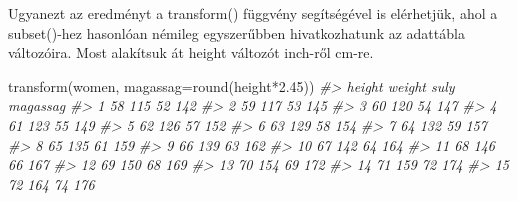 \documentclass[
]{book}
\newenvironment{Shaded}{\begin{snugshade}}{\end{snugshade}}
\newcommand{\AttributeTok}[1]{\textcolor[rgb]{0.77,0.63,0.00}{#1}}
\newcommand{\CommentTok}[1]{\textcolor[rgb]{0.56,0.35,0.01}{\textit{#1}}}
\newcommand{\FloatTok}[1]{\textcolor[rgb]{0.00,0.00,0.81}{#1}}
\newcommand{\FunctionTok}[1]{\textcolor[rgb]{0.00,0.00,0.00}{#1}}
\newcommand{\NormalTok}[1]{#1}
\newcommand{\OtherTok}[1]{\textcolor[rgb]{0.56,0.35,0.01}{#1}}
\newcommand{\SpecialCharTok}[1]{\textcolor[rgb]{0.00,0.00,0.00}{#1}}
\begin{document}
\begin{Shaded}
\end{Shaded}

Ugyanezt az eredményt a transform() függvény segítségével is elérhetjük, ahol a subset()-hez hasonlóan némileg egyszerűbben hivatkozhatunk az adattábla változóira. Most alakítsuk át height változót inch-ről cm-re.

\begin{Shaded}
\begin{Highlighting}[]
\FunctionTok{transform}\NormalTok{(women, }\AttributeTok{magassag=}\FunctionTok{round}\NormalTok{(height}\SpecialCharTok{*}\FloatTok{2.45}\NormalTok{))}
\CommentTok{\#\textgreater{}    height weight suly magassag}
\CommentTok{\#\textgreater{} 1      58    115   52      142}
\CommentTok{\#\textgreater{} 2      59    117   53      145}
\CommentTok{\#\textgreater{} 3      60    120   54      147}
\CommentTok{\#\textgreater{} 4      61    123   55      149}
\CommentTok{\#\textgreater{} 5      62    126   57      152}
\CommentTok{\#\textgreater{} 6      63    129   58      154}
\CommentTok{\#\textgreater{} 7      64    132   59      157}
\CommentTok{\#\textgreater{} 8      65    135   61      159}
\CommentTok{\#\textgreater{} 9      66    139   63      162}
\CommentTok{\#\textgreater{} 10     67    142   64      164}
\CommentTok{\#\textgreater{} 11     68    146   66      167}
\CommentTok{\#\textgreater{} 12     69    150   68      169}
\CommentTok{\#\textgreater{} 13     70    154   69      172}
\CommentTok{\#\textgreater{} 14     71    159   72      174}
\CommentTok{\#\textgreater{} 15     72    164   74      176}
\end{Highlighting}
\end{Shaded}
\end{document}
